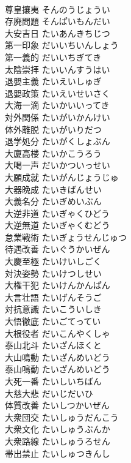 \documentclass[8pt]{extreport}
\begin{document}
\begin{CJK}{UTF8}{min}
\\	尊皇攘夷	そんのうじょうい	
\\	存廃問題	そんぱいもんだい	
\\	大安吉日	たいあんきちじつ	
\\	第一印象	だいいちいんしょう	
\\	第一義的	だいいちぎてき	
\\	太陰崇拝	たいいんすうはい	
\\	退嬰主義	たいえいしゅぎ	
\\	退嬰政策	たいえいせいさく	
\\	大海一滴	たいかいいってき	
\\	対外関係	たいがいかんけい	
\\	体外離脱	たいがいりだつ	
\\	退学処分	たいがくしょぶん	
\\	大廈高楼	たいかこうろう	
\\	大喝一声	だいかついっせい	
\\	大願成就	たいがんじょうじゅ	
\\	大器晩成	たいきばんせい	
\\	大義名分	たいぎめいぶん	
\\	大逆非道	たいぎゃくひどう	
\\	大逆無道	たいぎゃくむどう	
\\	怠業戦術	たいぎょうせんじゅつ	
\\	待遇改善	たいぐうかいぜん	
\\	大慶至極	たいけいしごく	
\\	対決姿勢	たいけつしせい	
\\	大権干犯	たいけんかんぱん	
\\	大言壮語	たいげんそうご	
\\	対抗意識	たいこういしき	
\\	大悟徹底	たいごてってい	
\\	大根役者	だいこんやくしゃ	
\\	泰山北斗	たいざんほくと	
\\	大山鳴動	たいざんめいどう	
\\	泰山鳴動	たいざんめいどう	
\\	大死一番	たいしいちばん	
\\	大慈大悲	だいじだいひ	
\\	体質改善	たいしつかいぜん	
\\	大衆団交	たいしゅうだんこう	
\\	大衆文化	たいしゅうぶんか	
\\	大衆路線	たいしゅうろせん	
\\	帯出禁止	たいしゅつきんし	

\end{CJK}
\end{document}

